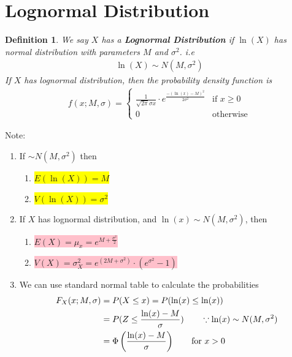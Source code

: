 \documentclass[11pt,oneside]{book}
\theoremstyle{newStyle}
\newtheorem{defn}[thm]{Definition}
\newcommand{\note}{\color{red}Note: \color{black}}
\begin{document}
\section[Lognormal Distribution]{Lognormal Distribution}
\begin{defn}
We say $X$ has a \textbf{Lognormal Distribution} if $\ln(X)$ has normal distribution with parameters $M$ and $\sigma^2$. i.e \begin{align*}
\ln(X)\sim N(M,\sigma^2)
\end{align*}
If $X$ has lognormal distribution, then the probability density function is \begin{align*}
f(x;M,\sigma)=\begin{cases}
\frac{1}{\sqrt{2\pi}\sigma x}\cdot e^{\frac{-(\ln(x)-M)^2}{2\sigma^2}} & \text{if }x\geq 0\\
0 & \text{otherwise}
\end{cases}
\end{align*}
\end{defn}
\note \begin{enumerate}
\item If $\sim N(M,\sigma^2)$ then\begin{enumerate}
\item \colorbox{yellow}{$E(\ln(X))=M$}
\item \colorbox{yellow}{$V(\ln(X))=\sigma^2$}
\end{enumerate}
\item If $X$ has lognormal distribution, and $\ln(x)\sim N(M,\sigma^2)$, then \begin{enumerate}
\item \colorbox{pink}{$E(X)=\mu_x=e^{M+\frac{\sigma^2}{2}}$}
\item \colorbox{pink}{$V(X)=\sigma_X^2=e^{(2M+\sigma^2)}\cdot (e^{\sigma^2}-1)$}
\end{enumerate}
\item We can use standard normal table to calculate the probabilities \begin{align*}
F_X(x;M,\sigma)&=P(X\leq x)=P(\ln(x)\leq \ln(x))\\
&=P(Z\leq \frac{\ln(x)-M}{\sigma}) \text{\qquad }\because \ln(x)\sim N(M,\sigma^2)\\
&=\Phi\left(\frac{\ln(x)-M}{\sigma} \right)\text{\qquad for }x>0 
\end{align*}
\end{enumerate}
\end{document}
